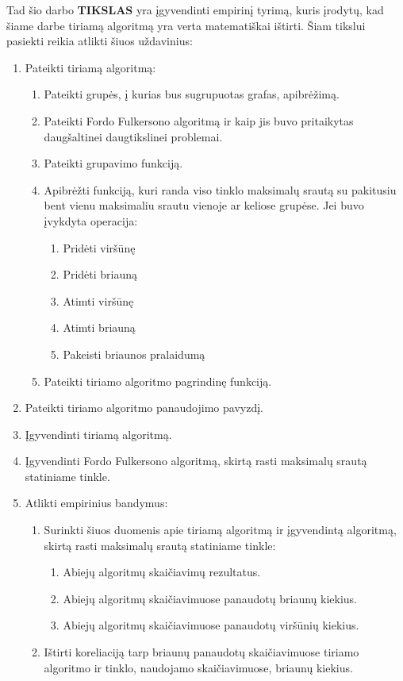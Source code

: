 Tad šio darbo \textbf{TIKSLAS} yra įgyvendinti empirinį tyrimą, kuris įrodytų, kad šiame darbe tiriamą algoritmą yra verta matematiškai ištirti. Šiam tikslui pasiekti reikia atlikti šiuos uždavinius:
\begin{enumerate}
	\item Pateikti tiriamą algoritmą:	
	\begin{enumerate}
		\item Pateikti grupės, į kurias bus sugrupuotas grafas, apibrėžimą.
		\item  Pateikti Fordo Fulkersono algoritmą ir kaip jis buvo pritaikytas daugšaltinei daugtikslinei problemai.
		\item Pateikti grupavimo funkciją.
		\item Apibrėžti funkciją, kuri randa viso tinklo maksimalų srautą su pakitusiu bent vienu maksimaliu srautu vienoje ar keliose grupėse. Jei buvo įvykdyta operacija:
		\begin{enumerate}
			\item Pridėti viršūnę
			\item Pridėti briauną
			\item Atimti viršūnę
			\item Atimti briauną
			\item Pakeisti briaunos pralaidumą
		\end{enumerate}
		\item Pateikti tiriamo algoritmo pagrindinę funkciją.
	\end{enumerate}
	\item Pateikti tiriamo algoritmo panaudojimo pavyzdį.
	\item Įgyvendinti tiriamą algoritmą.
	\item Įgyvendinti Fordo Fulkersono algoritmą, skirtą rasti maksimalų srautą statiniame tinkle.
	\item Atlikti empirinius bandymus:
		\begin{enumerate}
			\item Surinkti šiuos duomenis apie tiriamą algoritmą ir įgyvendintą algoritmą, skirtą rasti maksimalų srautą statiniame tinkle:
			\begin{enumerate}
				\item Abiejų algoritmų skaičiavimų rezultatus.
				\item Abiejų algoritmų skaičiavimuose panaudotų briaunų kiekius.
				\item Abiejų algoritmų skaičiavimuose panaudotų viršūnių  kiekius.
			\end{enumerate}
			\item Ištirti koreliaciją tarp briaunų panaudotų skaičiavimuose tiriamo algoritmo ir tinklo, naudojamo skaičiavimuose, briaunų kiekius. 

\end{enumerate}
\end{enumerate}
